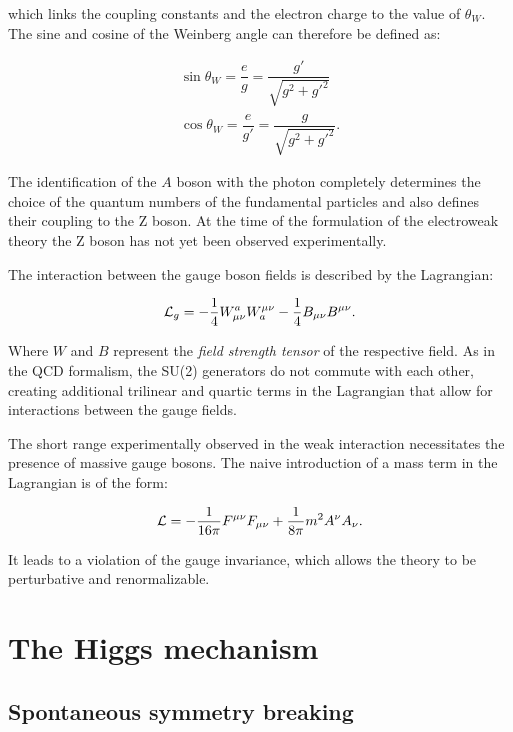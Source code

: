 which links the coupling constants and the electron charge to the value of $\theta_W$. The sine and cosine of the Weinberg angle can therefore be defined as:

\begin{equation}
\begin{matrix}
\operatorname{sin}\theta_W = \dfrac{e}{g} = \dfrac{g'}{\sqrt{g^2+g'^2}}\\ 
\operatorname{cos}\theta_W = \dfrac{e}{g'} = \dfrac{g}{\sqrt{g^2+g'^2}}.
\end{matrix}
\label{eq:win_angle}
\end{equation}

The identification of the $A$ boson with the photon completely determines the choice of the quantum numbers of the fundamental particles and also defines their coupling to the Z boson. At the time of the formulation of the electroweak theory the Z boson has not yet been observed experimentally.

The interaction between the gauge boson fields is described by the Lagrangian:

\begin{equation}
\mathcal{L}_g = -\dfrac{1}{4}W^a_{\mu\nu}W_a^{\mu\nu} -\dfrac{1}{4}B_{\mu\nu}B^{\mu\nu}.
\label{eq:weak_free}
\end{equation}

Where $W$ and $B$ represent the \emph{field strength tensor} of the respective field. As in the QCD formalism, the SU(2) generators do not commute with each other, creating additional trilinear and quartic terms in the Lagrangian that allow for interactions between the gauge fields.

The short range experimentally observed in the weak interaction necessitates the presence of massive gauge bosons. The naive introduction of a mass term in the Lagrangian is of the form:

\begin{equation}
\mathcal{L} = -\frac{1}{16\pi}F^{\mu\nu}F_{\mu\nu}+\frac{1}{8\pi}m^2 A^{\nu}A_{\nu}.
\label{eq:weak_free}
\end{equation}

It leads to a violation of the gauge invariance, which allows the theory to be perturbative and renormalizable.

\section{The Higgs mechanism}

\subsection{Spontaneous symmetry breaking}

